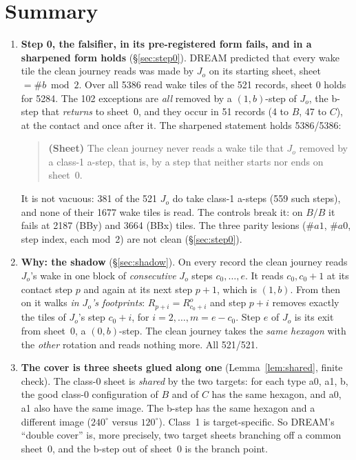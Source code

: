 \documentclass[11pt]{article}
\theoremstyle{definition}\newtheorem{definition}[theorem]{Definition}\newtheorem{remark}[theorem]{Remark}
\begin{document}
\section*{Summary}
\begin{enumerate}
\item \textbf{Step 0, the falsifier, in its pre-registered form fails, and in a sharpened form holds} (\S\ref{sec:step0}). DREAM predicted that every wake tile the clean journey reads was made by $J_o$ on its starting sheet, sheet $=\#b\bmod2$. Over all 5386 read wake tiles of the 521 records, sheet $0$ holds for 5284. The 102 exceptions are \emph{all} removed by a $(1,b)$-step of $J_o$, the b-step that \emph{returns} to sheet~0, and they occur in 51 records (4 to $B$, 47 to $C$), at the contact and once after it.
The sharpened statement holds 5386/5386:
\begin{quote}
\textbf{(Sheet)} The clean journey never reads a wake tile that $J_o$ removed by a class-1 a-step, that is, by a step that neither starts nor ends on sheet~$0$.
\end{quote}
It is not vacuous: 381 of the 521 $J_o$ do take class-1 a-steps (559 such steps), and none of their 1677 wake tiles is read. The controls break it: on $B/B$ it fails at 2187 (BBy) and 3664 (BBx) tiles. The three parity lesions ($\#a1$, $\#a0$, step index, each mod~2) are not clean (\S\ref{sec:step0}).
\item \textbf{Why: the shadow} (\S\ref{sec:shadow}). On every record the clean journey reads $J_o$'s wake in one block of \emph{consecutive} $J_o$ steps $c_0,\dots,e$. It reads $c_0,c_0+1$ at its contact step $p$ and again at its next step $p+1$, which is $(1,b)$. From then on it walks \emph{in $J_o$'s footprints}: $R_{p+i}=R^o_{c_0+i}$ and step $p+i$ removes exactly the tiles of $J_o$'s step $c_0+i$, for $i=2,\dots,m=e-c_0$. Step $e$ of $J_o$ is its exit from sheet~0, a $(0,b)$-step. The clean journey takes the \emph{same hexagon} with the \emph{other} rotation and reads nothing more. All 521/521.
\item \textbf{The cover is three sheets glued along one} (Lemma~\ref{lem:shared}, finite check). The class-0 sheet is \emph{shared} by the two targets: for each type a0, a1, b, the good class-0 configuration of $B$ and of $C$ has the same hexagon, and a0, a1 also have the same image. The b-step has the same hexagon and a different image ($240^\circ$ versus $120^\circ$). Class~1 is target-specific. So DREAM's ``double cover'' is, more precisely, two target sheets branching off a common sheet~0, and the b-step out of sheet~0 is the branch point.

\end{enumerate}
\end{document}
